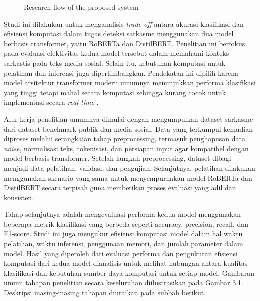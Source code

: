 \begin{figure}[H]

\caption{Research flow of the proposed system}
\label{fig:researchflow}

\end{figure}

Studi ini dilakukan untuk menganalisis \textit{trade-off} antara akurasi klasifikasi dan efisiensi komputasi dalam tugas deteksi sarkasme menggunakan dua model berbasis transformer, yaitu RoBERTa dan DistilBERT. Penelitian ini berfokus pada evaluasi efektivitas kedua model tersebut dalam memahami konteks sarkastis pada teks media sosial. Selain itu, kebutuhan komputasi untuk pelatihan dan inferensi juga dipertimbangkan. Pendekatan ini dipilih karena model arsitektur transformer modern umumnya menunjukkan performa klasifikasi yang tinggi tetapi mahal secara komputasi sehingga kurang cocok untuk implementasi secara \textit{\textit{real-time}} \cite{dubey2025unpacking}.

Alur kerja penelitian umumnya dimulai dengan mengumpulkan dataset sarkasme dari dataset benchmark publik dan media sosial. Data yang terkumpul kemudian diproses melalui serangkaian tahap preprocessing, termasuk penghapusan data \textit{noise}, normalisasi teks, tokenisasi, dan persiapan input agar kompatibel dengan model berbasis transformer. Setelah langkah preprocessing, dataset dibagi menjadi data pelatihan, validasi, dan pengujian. Selanjutnya, pelatihan dilakukan menggunakan skenario yang sama untuk menyempurnakan model RoBERTa dan DistilBERT secara terpisah guna memberikan proses evaluasi yang adil dan konsisten.

Tahap selanjutnya adalah mengevaluasi performa kedua model menggunakan beberapa metrik klasifikasi yang berbeda seperti accuracy, precision, recall, dan F1-score. Studi ini juga mengukur efisiensi komputasi model dalam hal waktu pelatihan, waktu inferensi, penggunaan memori, dan jumlah parameter dalam model. Hasil yang diperoleh dari evaluasi performa dan pengukuran efisiensi komputasi dari kedua model dianalisis untuk melihat hubungan antara kualitas klasifikasi dan kebutuhan sumber daya komputasi untuk setiap model. Gambaran umum tahapan penelitian secara keseluruhan diilustrasikan pada Gambar 3.1. Deskripsi masing-masing tahapan diuraikan pada subbab berikut.

